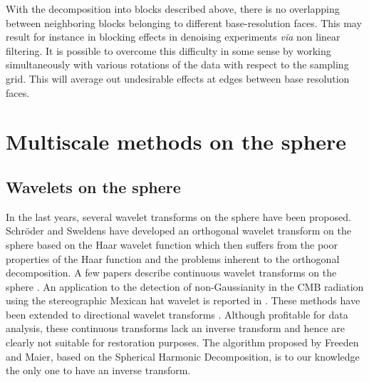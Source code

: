 With the decomposition into blocks described above, there is no overlapping between neighboring blocks belonging to different base-resolution faces. 
This may result for instance in blocking effects in denoising experiments \emph{via} non linear filtering. It is possible to overcome this difficulty 
in some sense by working simultaneously with various rotations of the data with respect to the sampling grid. This will average out undesirable 
effects at edges between base resolution faces. 

\section{Multiscale methods on the sphere}

\subsection{Wavelets on the sphere}

In the last years, several wavelet transforms on the sphere have been proposed. Schr{\"o}der and Sweldens \cite{wave:sweldens95a} have developed 
an orthogonal wavelet transform on the sphere based on the Haar wavelet function which then suffers from the poor properties of the Haar function 
and the problems inherent to the orthogonal decomposition. A few papers describe continuous wavelet transforms on the sphere \cite{wave:antoine99,wave:tenerio99,wave:cayon01,wave:holschneider96}. 
An application to the detection of non-Gaussianity in the CMB radiation using the stereographic Mexican hat wavelet is reported in \cite{wave:vielva04}. 
These methods have been extended to directional wavelet transforms \cite{wave:antoine01,wave:hobson04,wave:wiaux}. Although profitable for data 
analysis, these continuous transforms lack an inverse transform and hence are clearly not suitable for restoration purposes. The algorithm proposed 
by Freeden and Maier\cite{freeden97,freeden98}, based on the Spherical Harmonic Decomposition, is to our knowledge the only one to have an inverse transform.\\  

